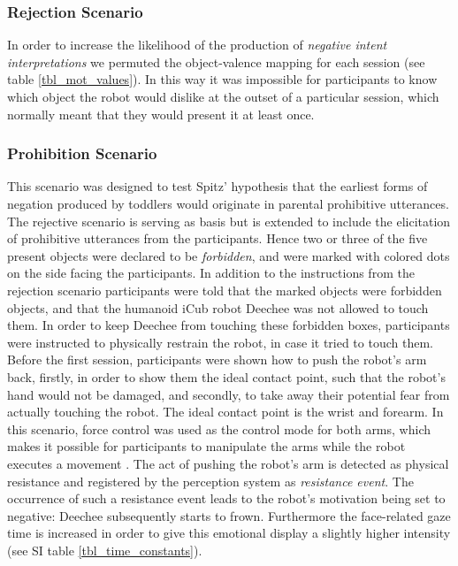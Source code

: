 \subsubsection{Rejection Scenario} In order to increase the likelihood of the production of \emph{negative intent interpretations} we permuted the object-valence
mapping for each session (see table \ref{tbl_mot_values}). In this way it was impossible for participants to know which object the robot would dislike at the
outset of a particular session, which normally meant that they would present it at least once.


\subsubsection{Prohibition Scenario} This scenario was designed to test Spitz' hypothesis that the earliest forms of negation produced by toddlers would originate in
parental prohibitive utterances. The rejective scenario is serving as basis but is extended to include the elicitation of prohibitive utterances from the participants. 
Hence two or three of the five present objects were declared to be \textit{forbidden}, and were marked with colored dots on the side facing the participants. In
addition to the instructions from the rejection scenario participants were told that the marked objects were forbidden objects, and that the humanoid iCub robot
Deechee was not allowed to touch them. 
In order to keep Deechee from touching these forbidden boxes, participants were instructed to physically restrain the robot, in case it tried to touch them. 
Before the first session, participants were shown how to push the robot's arm back, firstly, in order to show them the ideal contact point, such that the robot's hand 
would not be damaged, and secondly, to take away their potential fear from actually touching the robot. The ideal contact point is the wrist and forearm. In this 
scenario, force control was used as the control mode for both arms, which makes it possible for participants to manipulate the arms while the robot executes a movement 
\cite{Pattacini2010}. The act of pushing the robot's arm is detected as physical resistance and registered by the perception system as \textit{resistance event}.
The occurrence of such a resistance event leads to the robot's motivation being set to negative: Deechee subsequently starts to frown. Furthermore the face-related 
gaze time is increased in order to give this emotional display a slightly higher intensity (see SI table \ref{tbl_time_constants}).

